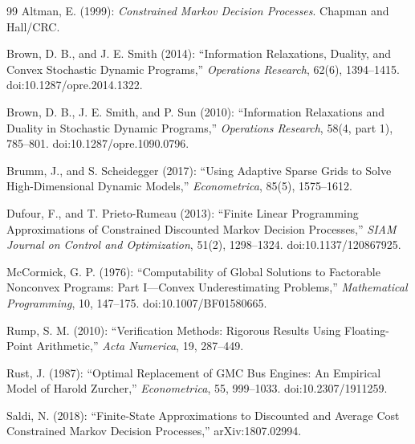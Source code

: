 \begingroup
\makeatletter
\renewcommand{\bibsection}{\@ifundefined{old@section}{\section*{\bibname}}{\old@section*{\bibname}}}
\makeatother
\begin{thebibliography}{99}
Altman, E. (1999): \emph{Constrained Markov Decision Processes}. Chapman and Hall/CRC.

Brown, D. B., and J. E. Smith (2014): ``Information Relaxations, Duality, and Convex Stochastic Dynamic Programs,'' \emph{Operations Research}, 62(6), 1394--1415. doi:10.1287/opre.2014.1322.

Brown, D. B., J. E. Smith, and P. Sun (2010): ``Information Relaxations and Duality in Stochastic Dynamic Programs,'' \emph{Operations Research}, 58(4, part 1), 785--801. doi:10.1287/opre.1090.0796.

Brumm, J., and S. Scheidegger (2017): ``Using Adaptive Sparse Grids to Solve High-Dimensional Dynamic Models,'' \emph{Econometrica}, 85(5), 1575--1612.

Dufour, F., and T. Prieto-Rumeau (2013): ``Finite Linear Programming Approximations of Constrained Discounted Markov Decision Processes,'' \emph{SIAM Journal on Control and Optimization}, 51(2), 1298--1324. doi:10.1137/120867925.

McCormick, G. P. (1976): ``Computability of Global Solutions to Factorable Nonconvex Programs: Part I---Convex Underestimating Problems,'' \emph{Mathematical Programming}, 10, 147--175. doi:10.1007/BF01580665.

Rump, S. M. (2010): ``Verification Methods: Rigorous Results Using Floating-Point Arithmetic,'' \emph{Acta Numerica}, 19, 287--449.

Rust, J. (1987): ``Optimal Replacement of GMC Bus Engines: An Empirical Model of Harold Zurcher,'' \emph{Econometrica}, 55, 999--1033. doi:10.2307/1911259.

Saldi, N. (2018): ``Finite-State Approximations to Discounted and Average Cost Constrained Markov Decision Processes,'' arXiv:1807.02994.

\end{thebibliography}
\endgroup
